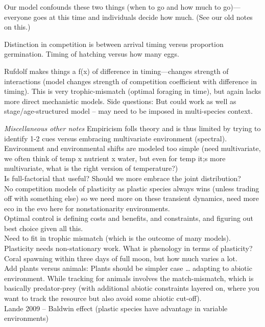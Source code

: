 \documentclass[11pt,letterpaper]{article}
\begin{document}
Our model confounds these two things (when to go and how much to go)---everyone goes at this time and individuals decide how much. (See our old notes on this.)

Distinction in competition is between arrival timing versus proportion germination. Timing of hatching versus how many eggs. 

Rufdolf makes things a f(x) of difference in timing---changes strength of interactions (model changes strength of competition coefficient with difference in timing). This is very trophic-mismatch (optimal foraging in time), but again lacks more direct mechanistic models. Side questions: But could work as well as stage/age-structured model -- may need to be imposed in multi-species context. 

\emph{Miscellaneous other notes}
Empiricism folls theory and is thus limited by trying to identify 1-2 cues versus embracing multivariate environment (spectral). \\
Environment and environmental shifts are modeled too simple (need multivariate, we often think of temp x nutrient x water, but even for temp it;s more multivariate, what is the right version of temperature?)\\
Is full-factorial that useful? Should we more embrace the joint distribution?\\
No competition models of plasticity as plastic species always wins (unless trading off with something else) so we need more on these transient dynamics, need more eco in the evo here for nonstationarity environments. \\
Optimal control is defining costs and benefits, and constraints, and figuring out best choice given all this.\\
Need to fit in trophic mismatch (which is the outcome of many models).\\
Plasticity needs non-stationary work. What is phenology in terms of plasticity?\\
Coral spawning within three days of full moon, but how much varies a lot.\\
Add plants versus animals: Plants should be simpler case  … adapting to abiotic environment. While tracking for animals involves the match-mismatch, which is basically predator-prey (with additional abiotic constraints layered on, where you want to track the resource but also avoid some abiotic cut-off). \\
Lande 2009 -- Baldwin effect (plastic species have advantage in variable environments) \\
\end{document}
